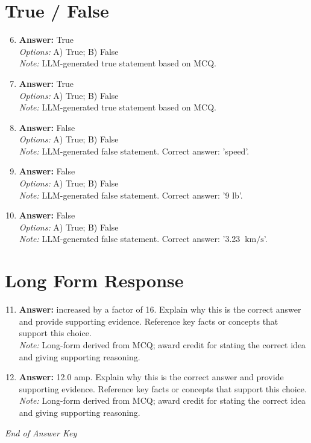 \documentclass[12pt]{article}
\begin{document}
\section*{True / False}
\begin{enumerate}[label=\arabic*.]
\setcounter{enumi}{5}
\item \textbf{Answer:} True
\\ \textit{Options:} A) True; B) False
\\ \textit{Note:} LLM-generated true statement based on MCQ.
\item \textbf{Answer:} True
\\ \textit{Options:} A) True; B) False
\\ \textit{Note:} LLM-generated true statement based on MCQ.
\item \textbf{Answer:} False
\\ \textit{Options:} A) True; B) False
\\ \textit{Note:} LLM-generated false statement. Correct answer: 'speed'.
\item \textbf{Answer:} False
\\ \textit{Options:} A) True; B) False
\\ \textit{Note:} LLM-generated false statement. Correct answer: '9 lb'.
\item \textbf{Answer:} False
\\ \textit{Options:} A) True; B) False
\\ \textit{Note:} LLM-generated false statement. Correct answer: '3.23 $ \mathrm{~km} / \mathrm{s}$'.
\end{enumerate}

\section*{Long Form Response}
\begin{enumerate}[label=\arabic*.]
\setcounter{enumi}{10}
\item \textbf{Answer:} increased by a factor of 16. Explain why this is the correct answer and provide supporting evidence. Reference key facts or concepts that support this choice.
\\ \textit{Note:} Long-form derived from MCQ; award credit for stating the correct idea and giving supporting reasoning.
\item \textbf{Answer:} 12.0 amp. Explain why this is the correct answer and provide supporting evidence. Reference key facts or concepts that support this choice.
\\ \textit{Note:} Long-form derived from MCQ; award credit for stating the correct idea and giving supporting reasoning.
\end{enumerate}

\vfill
\noindent\textit{End of Answer Key}
\end{document}
